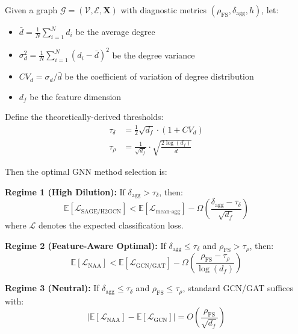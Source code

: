 \begin{theorem}
\label{thm:method_selection_rigorous}
Given a graph $\mathcal{G} = (\mathcal{V}, \mathcal{E}, \mathbf{X})$ with diagnostic metrics $(\rho_{\text{FS}}, \delta_{\text{agg}}, h)$, let:
\begin{itemize}
    \item $\bar{d} = \frac{1}{N}\sum_{i=1}^N d_i$ be the average degree
    \item $\sigma_d^2 = \frac{1}{N}\sum_{i=1}^N (d_i - \bar{d})^2$ be the degree variance
    \item $CV_d = \sigma_d / \bar{d}$ be the coefficient of variation of degree distribution
    \item $d_f$ be the feature dimension
\end{itemize}

Define the theoretically-derived thresholds:
\begin{align}
\tau_\delta &= \frac{1}{2}\sqrt{d_f} \cdot (1 + CV_d) \label{eq:tau_delta_theoretical} \\
\tau_\rho &= \frac{1}{\sqrt{d_f}} \cdot \sqrt{\frac{2\log(d_f)}{\bar{d}}} \label{eq:tau_rho_theoretical}
\end{align}

Then the optimal GNN method selection is:

\textbf{Regime 1 (High Dilution):} If $\delta_{\text{agg}} > \tau_\delta$, then:
\begin{equation}
\mathbb{E}[\mathcal{L}_{\text{SAGE/H2GCN}}] < \mathbb{E}[\mathcal{L}_{\text{mean-agg}}] - \Omega\left(\frac{\delta_{\text{agg}} - \tau_\delta}{\sqrt{d_f}}\right)
\end{equation}
where $\mathcal{L}$ denotes the expected classification loss.

\textbf{Regime 2 (Feature-Aware Optimal):} If $\delta_{\text{agg}} \leq \tau_\delta$ and $\rho_{\text{FS}} > \tau_\rho$, then:
\begin{equation}
\mathbb{E}[\mathcal{L}_{\text{NAA}}] < \mathbb{E}[\mathcal{L}_{\text{GCN/GAT}}] - \Omega\left(\frac{\rho_{\text{FS}} - \tau_\rho}{\log(d_f)}\right)
\end{equation}

\textbf{Regime 3 (Neutral):} If $\delta_{\text{agg}} \leq \tau_\delta$ and $\rho_{\text{FS}} \leq \tau_\rho$, standard GCN/GAT suffices with:
\begin{equation}
|\mathbb{E}[\mathcal{L}_{\text{NAA}}] - \mathbb{E}[\mathcal{L}_{\text{GCN}}]| = O\left(\frac{\rho_{\text{FS}}}{\sqrt{d_f}}\right)
\end{equation}
\end{theorem}


